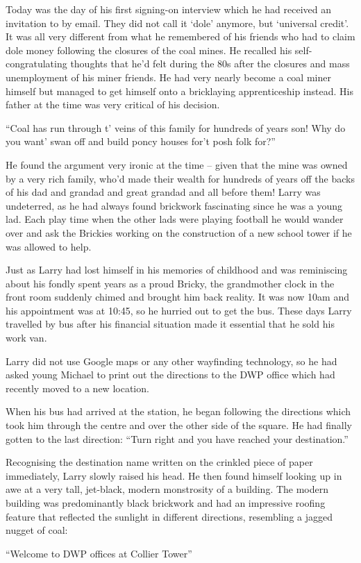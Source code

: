 Today was the day of his first signing-on interview which he had
received an invitation to by email. They did not call it ‘dole’
anymore, but ‘universal credit’. It was all very different from what
he remembered of his friends who had to claim dole money following the
closures of the coal mines. He recalled his self-congratulating
thoughts that he’d felt during the 80s after the closures and mass
unemployment of his miner friends. He had very nearly become a coal
miner himself but managed to get himself onto a bricklaying
apprenticeship instead. His father at the time was very critical of
his decision.

“Coal has run through t’ veins of this family for hundreds of years
son! Why do you want’ swan off and build poncy houses for’t posh folk
for?”

He found the argument very ironic at the time – given that the mine
was owned by a very rich family, who’d made their wealth for hundreds
of years off the backs of his dad and grandad and great grandad and
all before them!  Larry was undeterred, as he had always found
brickwork fascinating since he was a young lad. Each play time when
the other lads were playing football he would wander over and ask the
Brickies working on the construction of a new school tower if he was
allowed to help.

Just as Larry had lost himself in his memories of childhood and was
reminiscing about his fondly spent years as a proud Bricky, the
grandmother clock in the front room suddenly chimed and brought him
back reality. It was now 10am and his appointment was at 10:45, so he
hurried out to get the bus. These days Larry travelled by bus after
his financial situation made it essential that he sold his work van.

Larry did not use Google maps or any other wayfinding technology, so
he had asked young Michael to print out the directions to the DWP
office which had recently moved to a new location.

When his bus had arrived at the station, he began following the
directions which took him through the centre and over the other side
of the square. He had finally gotten to the last direction: “Turn
right and you have reached your destination.”

Recognising the destination name written on the crinkled piece of
paper immediately, Larry slowly raised his head. He then found himself
looking up in awe at a very tall, jet-black, modern monstrosity of a
building. The modern building was predominantly black brickwork and
had an impressive roofing feature that reflected the sunlight in
different directions, resembling a jagged nugget of coal:

“Welcome to DWP offices at Collier Tower”
 



